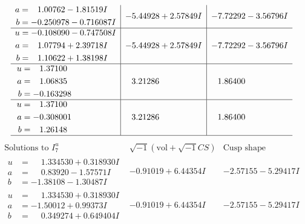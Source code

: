 \documentclass[1p]{elsarticle_modified}
\theoremstyle{definition}
\newcommand{\I}{\sqrt{-1}}
\begin{document}
$$\begin{array}{c|c|c}
\begin{aligned}
a &= \phantom{-}1.00762 - 1.81519 I \\
b &= -0.250978 - 0.716087 I\end{aligned}
 & -5.44928 + 2.57849 I & -7.72292 - 3.56796 I \\ \hline\begin{aligned}
u &= -0.108090 - 0.747508 I \\
a &= \phantom{-}1.07794 + 2.39718 I \\
b &= \phantom{-}1.10622 + 1.38198 I\end{aligned}
 & -5.44928 + 2.57849 I & -7.72292 - 3.56796 I \\ \hline\begin{aligned}
u &= \phantom{-}1.37100\phantom{ +0.000000I} \\
a &= \phantom{-}1.06835\phantom{ +0.000000I} \\
b &= -0.163298\phantom{ +0.000000I}\end{aligned}
 & \phantom{-}3.21286\phantom{ +0.000000I} & \phantom{-}1.86400\phantom{ +0.000000I} \\ \hline\begin{aligned}
u &= \phantom{-}1.37100\phantom{ +0.000000I} \\
a &= -0.308001\phantom{ +0.000000I} \\
b &= \phantom{-}1.26148\phantom{ +0.000000I}\end{aligned}
 & \phantom{-}3.21286\phantom{ +0.000000I} & \phantom{-}1.86400\phantom{ +0.000000I}\\
 \hline 
 \end{array}$$\newpage$$\begin{array}{c|c|c}  
\text{Solutions to }I^u_{7}& \I (\text{vol} + \sqrt{-1}CS) & \text{Cusp shape}\\
 \hline 
\begin{aligned}
u &= \phantom{-}1.334530 + 0.318930 I \\
a &= \phantom{-}0.83920 - 1.57571 I \\
b &= -1.38108 - 1.30487 I\end{aligned}
 & -0.91019 + 6.44354 I & -2.57155 - 5.29417 I \\ \hline\begin{aligned}
u &= \phantom{-}1.334530 + 0.318930 I \\
a &= -1.50012 + 0.99373 I \\
b &= \phantom{-}0.349274 + 0.649404 I\end{aligned}
 & -0.91019 + 6.44354 I & -2.57155 - 5.29417 I \\ \hline\begin{aligned}

\end{aligned}
\end{array}$$
\end{document}
